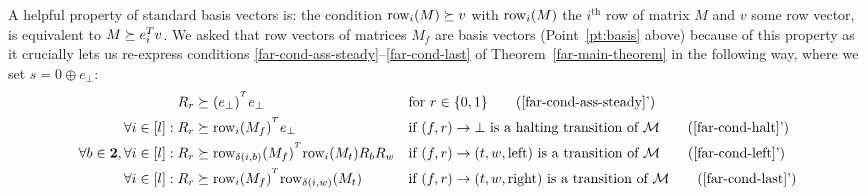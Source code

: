 {  A helpful property of standard basis vectors is: the condition $\text{row}_i(M) \succeq v$ with $\text{row}_i(M)$ the $i^\text{th}$ row of matrix $M$ and $v$ some row vector, is equivalent to $M\succeq e_i^T v$. We asked that row vectors of matrices $M_f$ are basis vectors (Point~\ref{pt:basis} above) because of this property as it crucially lets us re-express conditions \eqref{far-cond-ass-steady}--\eqref{far-cond-last} of Theorem~\ref{far-main-theorem} in the following way, where we set $s=0\oplus e_\bot$:
  \begin{align}
    R_r                                            & \succeq (e_\bot)^{\T}e_\bot
                                                   &                                                  & \text{for }r\in\{0,1\}
    \tag{\ref{far-cond-ass-steady}'}
    \\
    \forall i\in[l]: R_r                           & \succeq \row_i(M_f)^{\T}e_\bot
                                                   &                                                  & \text{if $(f,r) \to \bot$ is a halting transition of $\mathcal{M}$}
    \tag{\ref{far-cond-halt}'}
    \\
    \forall b \in \mathbf{2}, \forall i\in[l]: R_r & \succeq
    \row_{\delta(i,b)}(M_f)^{\T} \row_i(M_t)R_b R_w
                                                   &                                                  & \text{if $(f,r) \to (t,w,\text{left})$ is a transition of $\mathcal{M}$}
    \tag{\ref{far-cond-left}'}
    \\
    \forall i\in[l]: R_r                           & \succeq \row_i(M_f)^{\T} \row_{\delta(i,w)}(M_t)
                                                   &                                                  & \text{if $(f,r) \to (t,w,\text{right})$ is a transition of $\mathcal{M}$}
    \tag{\ref{far-cond-last}'}
  \end{align}


}



